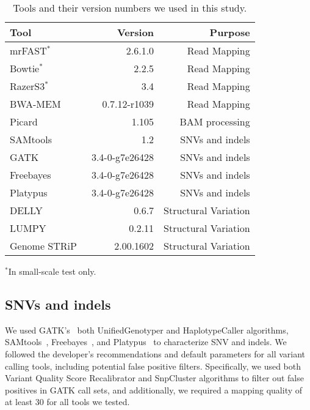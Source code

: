\documentclass[10pt,a4paper]{article}
\begin{document}
\begin{table}[htb]
\caption{Tools and their version numbers we used in this study.}
\begin{center}
\begin{tabular}{|l|r|r|}
\hline
{\bf Tool} & {\bf Version} & {\bf Purpose}\\
\hline
mrFAST$^*$~\cite{Alkan2009,Xin2013} & 2.6.1.0 & Read Mapping \\
Bowtie$^*$~\cite{Langmead2009} & 2.2.5 & Read Mapping \\
RazerS3$^*$~\cite{Weese2012} & 3.4 & Read Mapping\\
BWA-MEM~\cite{Li2013} & 0.7.12-r1039 & Read Mapping\\
Picard~\cite{picard} & 1.105 & BAM processing\\
SAMtools~~\cite{Li2009b} & 1.2 & SNVs and indels\\
GATK~\cite{DePristo2011} & 3.4-0-g7e26428 & SNVs and indels\\
Freebayes~\cite{Garrison2012} & 3.4-0-g7e26428 & SNVs and indels\\
Platypus~\cite{Rimmer2014} & 3.4-0-g7e26428 & SNVs and indels\\
DELLY~\cite{Rausch2012} & 0.6.7 & Structural Variation\\
LUMPY~\cite{Layer2014} & 0.2.11 & Structural Variation\\
Genome STRiP~\cite{Handsaker2011,Handsaker2015} & 2.00.1602 & Structural Variation\\
\hline
\end{tabular}
\end{center}
    {\footnotesize $^*$In small-scale test only.}

\label{tab:tools}
\end{table}

\subsection{SNVs and indels}

We used GATK's~\cite{DePristo2011} both UnifiedGenotyper and HaplotypeCaller algorithms, SAMtools~\cite{Li2009b}, Freebayes~\cite{Garrison2012}, and Platypus~\cite{Rimmer2014} to characterize
SNV and indels. We followed the developer's recommendations and default parameters for all variant calling tools, including potential false positive filters. 
Specifically, we used both Variant Quality Score Recalibrator and SnpCluster algorithms to filter out false positives in GATK call sets, and additionally, 
we required a mapping quality of at least 30 for all tools we tested.
\end{document}
